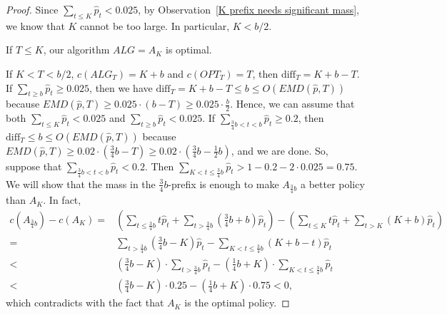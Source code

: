 \begin{proof}
    Since $\sum_{t \leq K} \hat{p}_t < 0.025$, by Observation~\ref{K prefix needs significant mass}, we know that $K$ cannot be too large. In particular, $K<b/2$.
    
    If $T \leq K$, our algorithm $ALG=A_K$ is optimal.

    If $K<T<b/2$, $c(ALG_T)=K+b$ and $c(OPT_T)=T$, then $\text{diff}_T = K+b-T$. If $\sum_{t \geq b}\hat{p}_t \geq 0.025$, then we have $\text{diff}_T = K+b-T \leq b \leq O(EMD(\hat{p},T))$ because $EMD(\hat{p},T) \geq 0.025\cdot(b-T)\geq 0.025 \cdot \frac{b}{2}$. Hence, we can assume that both $\sum_{t \leq K}\hat{p}_t < 0.025$ and $\sum_{t \geq b}\hat{p}_t < 0.025$. If $\sum_{\frac{3}{4}b<t<b}\hat{p}_t \geq 0.2$, then $\text{diff}_T \leq b \leq O(EMD(\hat{p},T))$ because $EMD(\hat{p},T) \geq 0.02\cdot(\frac{3}{4}b-T)\geq 0.02 \cdot (\frac{3}{4}b - \frac{1}{2}b)$, and we are done. So, suppose that $\sum_{\frac{3}{4}b<t<b}\hat{p}_t < 0.2$. Then $\sum_{K<t \leq \frac{3}{4}b}\hat{p}_t > 1- 0.2-2\cdot 0.025=0.75$. We will show that the mass in the $\frac{3}{4}b$-prefix is enough to make $A_{\frac{3}{4}b}$ a better policy than $A_K$. In fact,
    \begin{align*}
    c(A_{\frac{3}{4}b}) - c(A_K) =& \left( \sum_{t \leq \frac{3}{4}b} t\hat{p}_t + \sum_{t>\frac{3}{4}b} (\frac{3}{4}b +b)\hat{p}_t \right) -  
    \left( \sum_{t \leq K} t\hat{p}_t + \sum_{t>K} (K +b)\hat{p}_t \right)\\
    =& \sum_{t>\frac{3}{4}b}\left( \frac{3}{4}b - K \right)\hat{p}_t - \sum_{K< t \leq \frac{3}{4}b} \left( K+b-t \right)\hat{p}_t\\
    <& \left( \frac{3}{4}b - K \right) \cdot \sum_{t>\frac{3}{4}b}\hat{p}_t - \left( \frac{1}{4}b + K \right)\cdot \sum_{K< t \leq \frac{3}{4}b}\hat{p}_t \\
    <& \left( \frac{3}{4}b - K \right) \cdot 0.25 - \left( \frac{1}{4}b + K \right)\cdot 0.75 <0,
    \end{align*}
    which contradicts with the fact that $A_K$ is the optimal policy.


\end{proof}
